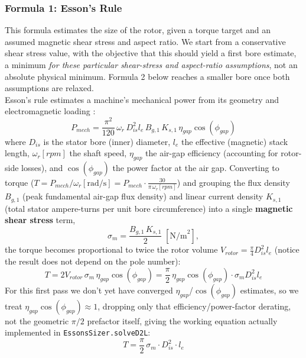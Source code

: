 \documentclass[10pt,final,journal,a4paper,oneside,twocolumn]{IEEEtran}
\begin{document}
\subsubsection{Formula 1: Esson's Rule}
This formula estimates the size of the rotor, given a torque target and an assumed magnetic shear stress and aspect ratio. We start from a conservative shear stress value, with the objective that this should yield a first bore estimate, a minimum \emph{for these particular shear-stress and aspect-ratio assumptions}, not an absolute physical minimum. Formula 2 below reaches a smaller bore once both assumptions are relaxed.
\\Esson's rule estimates a machine's mechanical power from its geometry and electromagnetic loading \cite{LucaLecture6}:
\begin{equation*}
P_{mech} = \frac{\pi^2}{120}\,\omega_r\,D_{is}^2 l_e\, B_{g,1}\,K_{s,1}\,\eta_{gap}\cos(\phi_{gap})
\end{equation*}
where $D_{is}$ is the stator bore (inner) diameter, $l_e$ the effective (magnetic) stack length, $\omega_r[rpm]$ the shaft speed, $\eta_{gap}$ the air-gap efficiency (accounting for rotor-side losses), and $\cos(\phi_{gap})$ the power factor at the air gap. Converting to torque ($T=P_{mech}/\omega_r[\text{rad/s}]=P_{mech}\cdot\frac{30}{\pi\,\omega_r[rpm]}$) and grouping the flux density $B_{g,1}$ (peak fundamental air-gap flux density) and linear current density $K_{s,1}$ (total stator ampere-turns per unit bore circumference) into a single \textbf{magnetic shear stress} term,
\begin{equation*}
\sigma_m = \frac{B_{g,1}\,K_{s,1}}{2}\;[\text{N/m}^2],
\end{equation*}
the torque becomes proportional to twice the rotor volume $V_{rotor}=\frac{\pi}{4}D_{is}^2l_e$ (notice the result does not depend on the pole number):
\begin{equation*}
T = 2V_{rotor}\,\sigma_m\,\eta_{gap}\cos(\phi_{gap}) = \frac{\pi}{2}\,\eta_{gap}\cos(\phi_{gap})\cdot\sigma_m D_{is}^2 l_e
\end{equation*}
For this first pass we don't yet have converged $\eta_{gap}$/$\cos(\phi_{gap})$ estimates, so we treat $\eta_{gap}\cos(\phi_{gap})\approx 1$, dropping only that efficiency/power-factor derating, not the geometric $\pi/2$ prefactor itself, giving the working equation actually implemented in \texttt{EssonsSizer.solveD2L}:
\begin{equation}
\label{eq:essons_rule}
T = \frac{\pi}{2}\,\sigma_m \cdot D_{is}^2 \cdot l_e
\end{equation}
\end{document}
